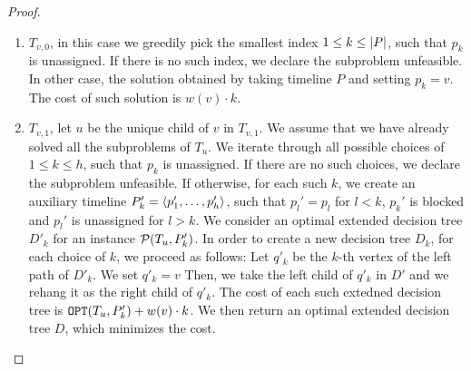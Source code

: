 \begin{theorem}
\begin{proof}


    \begin{enumerate}
        \item $T_{v,0}$, in this case we greedily pick the smallest index $1 \leq k \leq \mathopen{}\left| P \right|$, such that $p_k$ is unassigned. If there is no such index, we declare the subproblem unfeasible. In other case, the solution obtained by taking timeline $P$ and setting $p_k=v$. The cost of such solution is $w(v)\cdot k$.
        \item $T_{v,1}$, let $u$ be the unique child of $v$ in $T_{v,1}$. We assume that we have already solved all the subproblems of $T_u$.
        We iterate through all possible choices of $1\leq k \leq h$, such that $p_k$ is unassigned. If there are no such choices, we declare the subproblem unfeasible. If otherwise, for each such $k$, we create an auxiliary timeline $P_k'=
        \mathopen{}\langle p_1',\dots,p_h' \rangle$, such that $p_l'=p_l$ for $l < k$, $p_k'$ is blocked and $p_l'$ is unassigned for $l>k$. We consider an optimal extended decision tree $D'_k$ for an instance $\mathcal{P}\mathopen{}\left( T_{u}, P_k' \right)$. In order to create a new decision tree $D_k$, for each choice of $k$, we proceed as follows: Let $q'_k$ be the $k$-th vertex of the left path of $D'_k$. We set $q'_k=v$ Then, we take the left child of $q'_k$ in $D'$ and we rehang it as the right child of $q'_k$.
        The cost of each such extedned decision tree is $\texttt{OPT}\mathopen{}\left( T_{u}, P_k' \right)+w(v)\cdot k$. We then return an optimal extended decision tree $D$, which minimizes the cost.

\end{enumerate}
\end{proof}
\end{theorem}
